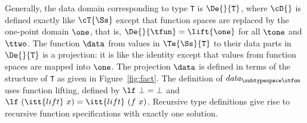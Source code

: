 \documentclass[11pt]{article}
\begin{document}
Generally, the data domain corresponding to type \mbox{\tt T} is $\De{}{\mbox{\tt T}}$,
where $\cD{}$ is defined exactly like $\cT{\Ss}$ except that function
spaces are replaced by the one-point domain $\one$, that is,
$\De{}{\tfun}=\lift{\one}$ for all $\tone$ and $\ttwo$.  
The function $\data$ from values in
$\Te{\Ss}{\mbox{\tt T}}$ to their data parts in $\De{}{\mbox{\tt T}}$ is a projection:
it is like the identity except that values from function spaces are
mapped into $\one$.  The projection $\data$ is defined in terms of the
structure of \mbox{\tt T} as given in Figure~\ref{fig:fact}.
The definition of ${\it{}data}_{\subtypespace\stfun}$ uses function lifting, 
defined by $\lf~\bot=\bot$
and $\lf~(\itt{lift}~x)=\itt{lift}~(f~x)$.  Recursive type definitions
give rise to recursive function specifications with exactly one solution.
\end{document}

